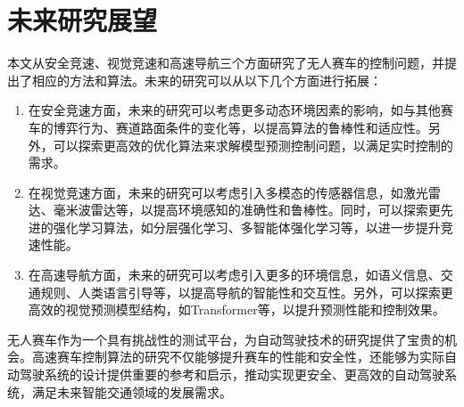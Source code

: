 \section{未来研究展望}
本文从安全竞速、视觉竞速和高速导航三个方面研究了无人赛车的控制问题，并提出了相应的方法和算法。未来的研究可以从以下几个方面进行拓展：
\begin{enumerate}
    \item 在安全竞速方面，未来的研究可以考虑更多动态环境因素的影响，如与其他赛车的博弈行为、赛道路面条件的变化等，以提高算法的鲁棒性和适应性。另外，可以探索更高效的优化算法来求解模型预测控制问题，以满足实时控制的需求。
    \item 在视觉竞速方面，未来的研究可以考虑引入多模态的传感器信息，如激光雷达、毫米波雷达等，以提高环境感知的准确性和鲁棒性。同时，可以探索更先进的强化学习算法，如分层强化学习、多智能体强化学习等，以进一步提升竞速性能。
    \item 在高速导航方面，未来的研究可以考虑引入更多的环境信息，如语义信息、交通规则、人类语言引导等，以提高导航的智能性和交互性。另外，可以探索更高效的视觉预测模型结构，如Transformer等，以提升预测性能和控制效果。
\end{enumerate}

无人赛车作为一个具有挑战性的测试平台，为自动驾驶技术的研究提供了宝贵的机会。高速赛车控制算法的研究不仅能够提升赛车的性能和安全性，还能够为实际自动驾驶系统的设计提供重要的参考和启示，推动实现更安全、更高效的自动驾驶系统，满足未来智能交通领域的发展需求。